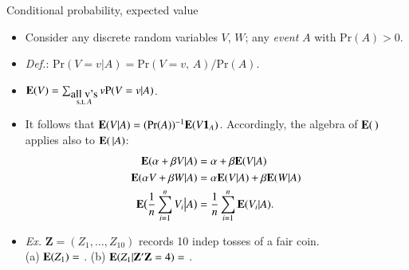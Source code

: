 \begin{frame}{Conditional probability, expected value}
  \begin{itemize}
  \item<1-> Consider any discrete random variables $V$, $W$;  any
    \textit{event} $A$ with $\mathrm{Pr}(A) >0 $. 
  \item<1-> \textit{Def.}: $\mathrm{Pr}(V= v | A) = \mathrm{Pr}(V=v,\, A) /\mathrm{Pr}(A) $. 
  \item<2->  $\mathbf{E}(V) = \sum_{\substack{\mbox{all v's}\\
        \mathrm{s.t.}\, A}} v\mathrm{P}(V=v | A) $.
  \item<3->  It follows that $\mathbf{E}  (V | A) = (\mathrm{Pr}(A))^{-1} \mathbf{E}
    (V \mathbf{1}_{A} )$.  Accordingly, the algebra of $\mathbf{E} ( \, ) $
    applies also to $\mathbf{E}(\, |A) $:\\
    \begin{align*}
     \mathbf{E}(\alpha + \beta V| A) &=
    \alpha + \beta\mathbf{E}(V| A) \\
     \mathbf{E}(\alpha V + \beta W | A) &=  \alpha \mathbf{E}(V|A) + \beta \mathbf{E}(W|A)
      \\
      \mathbf{E}\big(\frac{1}{n} \sum_{i=1}^n V_i \big| A \big) &= \frac{1}{n} \sum_{i=1}^n \mathbf{E} (V_i|A).
    \end{align*}
\item<4-> \textit{Ex.} $\mathbf{Z} = (Z_{1}, \ldots, Z_{10}) $ records
  10 indep tosses of a fair coin.\\ (a) $\mathbf{E} (Z_{1}) = $
  \underline{\hspace{2em}}. (b) $\mathbf{E} (Z_{1} | \mathbf{Z}'\mathbf{Z}=4)
  =$ \underline{\hspace{2em}}.

  \end{itemize}
\end{frame}

